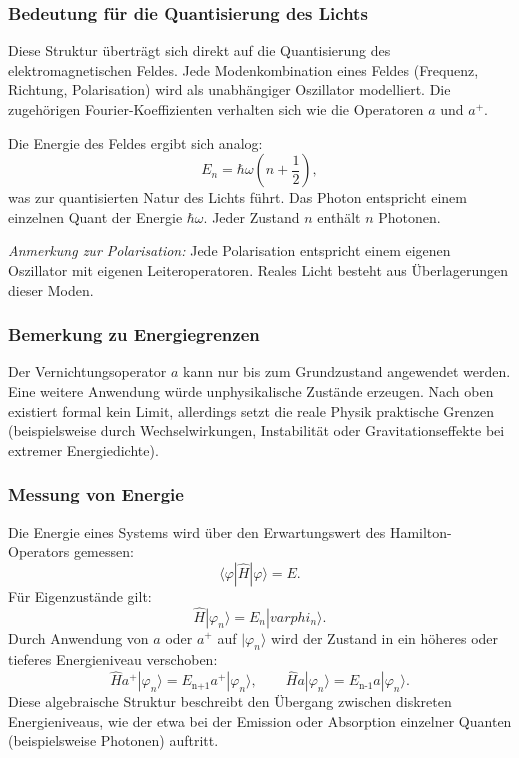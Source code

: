 		\subsubsection{Bedeutung für die Quantisierung des Lichts\label{fourier:subsubsection:QuantisierungElmagFeld}}
			Diese Struktur überträgt sich direkt auf die Quantisierung des elektromagnetischen Feldes.
			Jede Modenkombination eines Feldes (Frequenz, Richtung, Polarisation) wird als unabhängiger Oszillator modelliert.
			Die zugehörigen Fourier-Koeffizienten verhalten sich wie die Operatoren $a$ und $a^+$.

			Die Energie des Feldes ergibt sich analog:
			\[
				E_n = \hbar\omega\left(n + \frac{1}{2}\right),
			\]
			was zur quantisierten Natur des Lichts  führt.
			Das Photon entspricht einem einzelnen Quant der Energie $\hbar\omega$.
			Jeder Zustand $n$ enthält $n$ Photonen.
			
			\textit{Anmerkung zur Polarisation:}
			Jede Polarisation entspricht einem eigenen Oszillator mit eigenen Leiteroperatoren.
			Reales Licht besteht aus Überlagerungen dieser Moden.

		\subsubsection{Bemerkung zu Energiegrenzen\label{fourier:subsubsection:BemerkungBegrenztheitDerEnergie}}
			Der Vernichtungsoperator $a$ kann nur bis zum Grundzustand angewendet werden.
			Eine weitere Anwendung würde unphysikalische Zustände erzeugen.
			Nach oben existiert formal kein Limit, allerdings setzt die reale Physik praktische Grenzen (beispielsweise durch Wechselwirkungen, Instabilität oder Gravitationseffekte bei extremer Energiedichte).

		\subsubsection{Messung von Energie\label{fourier:subsubsection:MessungQuantisierterEnergie}}
			Die Energie eines Systems wird über den Erwartungswert des Hamilton-Operators gemessen:
			\begin{equation}
				\langle\varphi|\hat{H}|\varphi\rangle = E.
			\end{equation}
			Für Eigenzustände gilt:
			\begin{equation}
				\hat{H}|\varphi_n\rangle = E_n|varphi_n\rangle.
			\end{equation}
			Durch Anwendung von $a$ oder $a^+$ auf $|\varphi_n\rangle$ wird der Zustand in ein höheres oder tieferes Energieniveau verschoben:
			\[
				\hat{H}a^+|\varphi_n\rangle = E_\text{n+1}a^+|\varphi_n\rangle, \qquad \hat{H}a|\varphi_n\rangle = E_\text{n-1}a|\varphi_n\rangle.
			\]
			Diese algebraische Struktur beschreibt den Übergang zwischen diskreten Energieniveaus, wie der etwa bei der Emission oder Absorption einzelner Quanten (beispielsweise Photonen) auftritt.

